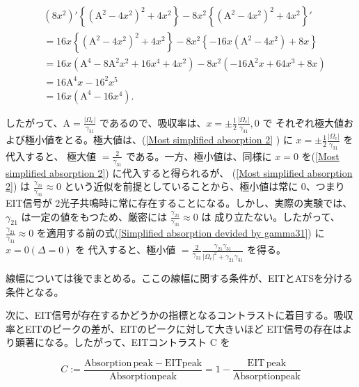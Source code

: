 \documentclass[11pt,a4paper]{ltjsarticle}
\begin{document}
\begin{align*}
    & \left( 8x^2  \right)' \left\{ { \left( \mathrm{A}^2 - 4x^2  \right) }^2 + 4x^2 \right\} - 8x^2 \left\{  { \left( \mathrm{A}^2 - 4x^2  \right) }^2 + 4x^2 \right\}' \\
    &= 16x \left\{ { \left( \mathrm{A}^2 - 4x^2  \right) }^2 + 4x^2 \right\} - 8x^2 \left\{  -16x \left( \mathrm{A}^2 - 4x^2  \right)  + 8x \right\}  \\
    &= 16x \left( \mathrm{A}^4 - 8 \mathrm{A^2} x^2 + 16 x^4 + 4x^2  \right) - 8x^2 \left( -16 \mathrm{A}^2 x + 64 x^3 + 8x \right) \\
    &= 16 \mathrm{A}^4 x - {16}^2 x^5\\
    &= 16x \left( \mathrm{A^4} - 16 x^4 \right).
\end{align*}

したがって、$\mathrm{A} = \frac{ |\Omega_{\mathrm{c}}| }{\gamma_{31}}$ であるので、吸収率は、$ x = \pm \frac{1}{2} \frac{|\Omega_{\mathrm{c}}|}{\gamma_{31}}, 0$ で
それぞれ極大値および極小値をとる。極大値は、(\ref{Most simplified absorption 2} ) に $x = \pm \frac{1}{2} \frac{|\Omega_{\mathrm{c}}|}{\gamma_{31}}$ を代入すると、
極大値 $= \frac{2}{\gamma_{31}}$ である。一方、極小値は、同様に $x = 0$ を(\ref{Most simplified absorption 2}) に代入すると得られるが、
(\ref{Most simplified absorption 2}) は $\frac{\gamma_{21}}{\gamma_{31}} \approx 0$ という近似を前提としていることから、極小値は常に $0$、つまりEIT信号が
2光子共鳴時に常に存在することになる。しかし、実際の実験では、$\gamma_{21}$ は一定の値をもつため、厳密には $\frac{\gamma_{21}}{\gamma_{31}} \approx 0$ は
成り立たない。したがって、 $\frac{\gamma_{21}}{\gamma_{31}} \approx 0$  を適用する前の式(\ref{Simplified absorption devided by gamma31}) に$x = 0 (\Delta = 0)$ を
代入すると、極小値 $= \frac{2}{\gamma_{31}} \frac{\gamma_{21} \gamma_{31}}{ { |\Omega_{\mathrm{c}}| }^2 + \gamma_{21} \gamma_{31} }$
を得る。


{\color{red}線幅については後でまとめる。ここの線幅に関する条件が、EITとATSを分ける条件となる。}

次に、EIT信号が存在するかどうかの指標となるコントラストに着目する。吸収率とEITのピークの差が、EITのピークに対して大きいほど
EIT信号の存在はより顕著になる。したがって、EITコントラスト $\mathrm{C}$ を

\begin{equation*}
  C := \frac{\mathrm{Absorption \, peak} - \mathrm{EIT peak}}{\mathrm{Absorption peak} } = 1 - \frac{\mathrm{EIT \, peak}}{\mathrm{Absorption peak}}
\end{equation*}
\end{document}
